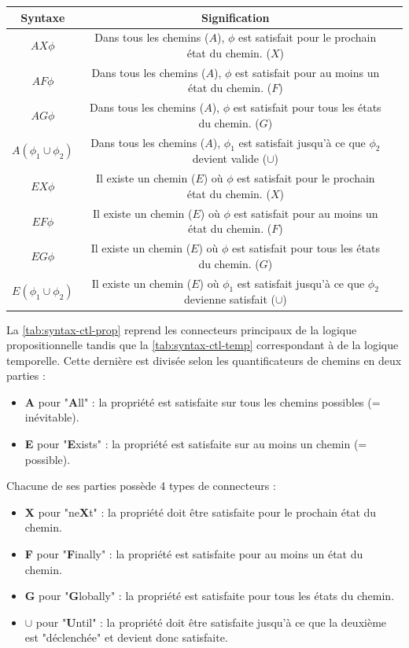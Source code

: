 \documentclass[runningheads,a4paper,10pt]{llncs}
\begin{document}
\begin{center}
\begin{tabular}{|c|c|c|}
  \hline
  Syntaxe & Signification \\
  \hline
  $AX\phi$ & Dans tous les chemins ($A$), $\phi$ est satisfait pour le prochain état du chemin. ($X$)\\
  $AF\phi$ & Dans tous les chemins ($A$), $\phi$ est satisfait pour au moins un état du chemin. ($F$) \\
  $AG\phi$ & Dans tous les chemins ($A$), $\phi$ est satisfait pour tous les états du chemin. ($G$) \\
  $A(\phi_{1} \cup \phi_{2})$ & Dans tous les chemins ($A$), $\phi_{1}$ est satisfait jusqu'à ce que $\phi_{2}$ devient valide ($\cup$) \\
  \hline
  $EX\phi$ & Il existe un chemin ($E$) où $\phi$ est satisfait pour le prochain état du chemin. ($X$) \\
  $EF\phi$ & Il existe un chemin ($E$) où $\phi$ est satisfait pour au moins un état du chemin. ($F$)\\
  $EG\phi$ & Il existe un chemin ($E$) où $\phi$ est satisfait pour tous les états du chemin. ($G$)\\
  $E(\phi_{1} \cup \phi_{2})$ & Il existe un chemin ($E$) où $\phi_{1}$ est satisfait jusqu'à ce que $\phi_{2}$ devienne satisfait ($\cup$) \\
  
 \hline
 
\end{tabular}
 \label{tab:syntax-ctl-temp}
\end{center}

La \autoref{tab:syntax-ctl-prop} reprend les connecteurs principaux de la logique propositionnelle tandis que la \autoref{tab:syntax-ctl-temp} correspondant à de la logique temporelle. Cette dernière est divisée selon les quantificateurs de chemins en deux parties : 
\begin{itemize}
\item \textbf{A} pour "\textbf{A}ll" : la propriété est satisfaite sur tous les chemins possibles (= inévitable).
\item \textbf{E} pour "\textbf{E}xists" : la propriété est satisfaite sur au moins un chemin (= possible).
\end{itemize}

Chacune de ses parties possède 4 types de connecteurs : 
\begin{itemize}
\item \textbf{X} pour "ne\textbf{X}t" : la propriété doit être satisfaite pour le prochain état du chemin. 
\item \textbf{F} pour "\textbf{F}inally" : la propriété est satisfaite pour au moins un état du chemin.
\item \textbf{G} pour "\textbf{G}lobally" : la propriété est satisfaite pour tous les états du chemin.
\item $\pmb{\cup}$ pour "\textbf{U}ntil" : la propriété doit être satisfaite jusqu'à ce que la deuxième est "déclenchée" et devient donc satisfaite. \\
\end{itemize}
\end{document}
